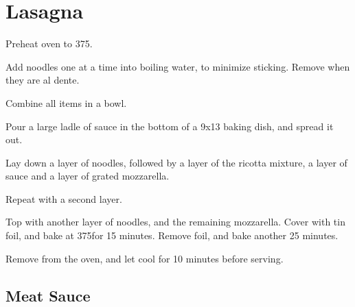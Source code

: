 
\section{Lasagna}
\begin{recipe}


Preheat oven to 375\degree.


Add noodles one at a time into boiling water, to minimize sticking. Remove when they are al dente.


Combine all items in a bowl.


Pour a large ladle of sauce in the bottom of a 9x13 baking dish, and spread it out.

Lay down a layer of noodles, followed by a layer of the ricotta mixture, a layer of sauce and a layer of grated mozzarella.

Repeat with a second layer.

Top with another layer of noodles, and the remaining mozzarella. Cover with tin foil, and bake at 375\degree for 15 minutes. Remove foil, and bake another 25 minutes.

Remove from the oven, and let cool for 10 minutes before serving.

\columnbreak

\subsection{Meat Sauce}




\end{recipe}
